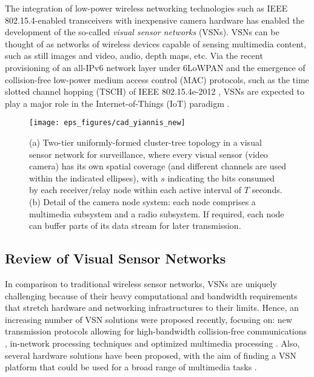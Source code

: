 \documentclass[twocolumn,english]{IEEEtran}
\theoremstyle{plain}
\theoremstyle{definition}
\begin{document}
The integration of low-power wireless networking technologies such
as IEEE 802.15.4-enabled transceivers with inexpensive camera hardware
has enabled the development of the so-called \emph{visual sensor networks}
(VSNs)\cite{charfi2009VSN}. VSNs can be thought of as networks of
wireless devices capable of sensing multimedia content, such as still
images and video, audio, depth maps, etc. Via the recent provisioning
of an all-IPv6 network layer under 6LoWPAN \cite{wang2012IPV6} and
the emergence of collision-free low-power medium access control (MAC)
protocols, such as the time slotted channel hopping (TSCH) of IEEE
802.15.4e-2012 \cite{tinka2010TSCH}, VSNs are expected to play a
major role in the Internet-of-Things (IoT) paradigm \cite{zorzi2010IoT,gubbi2013IoT}.







\begin{figure*}[t]
\centering{}

\texttt{[image: eps\_figures/cad\_yiannis\_new]}
\caption{(a) Two-tier uniformly-formed cluster-tree topology in a visual sensor
network for surveillance, where every visual sensor (video camera)
has its own spatial coverage (and different channels are used within
the indicated ellipses), with $s$ indicating the bits consumed by
each receiver/relay node within each active interval of $T$ seconds.
(b) Detail of the camera node system: each node comprises a multimedia
subsystem and a radio subsystem. If required, each node can buffer
parts of its data stream for later transmission. }


\label{fig:System_model} 
\end{figure*}



\subsection{Review of Visual Sensor Networks}

In comparison to traditional wireless sensor networks, VSNs are uniquely
challenging because of their heavy computational and bandwidth requirements
that stretch hardware and networking infrastructures to their limits.
Hence, an increasing number of VSN solutions were proposed recently,
focusing on: new transmission protocols allowing for high-bandwidth
collision-free communications \cite{ehsan2012survey}\cite{burana2012DTFDMA},
in-network processing techniques \cite{zuo2012two} and optimized
multimedia processing \cite{pudlewski2012compressed}. Also, several
hardware solutions have been proposed, with the aim of finding a VSN
platform that could be used for a broad range of multimedia tasks
\cite{mingorance2010efficient,newell2009self,CancliniSENSYS2013}.
\end{document}
